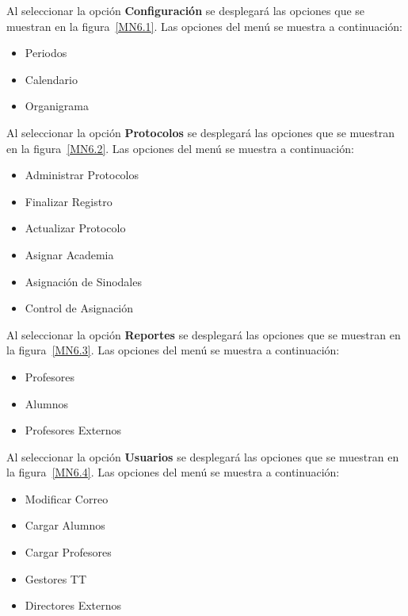 	
	
	Al seleccionar la opción \textbf{Configuración} se desplegará las opciones que se muestran en la figura~\ref{MN6.1}. Las opciones del menú se muestra a continuación:
	\begin{itemize}
		\item Periodos
		\item Calendario
		\item Organigrama
	\end{itemize}
	
	
	
	Al seleccionar la opción \textbf{Protocolos} se desplegará las opciones que se muestran en la figura~\ref{MN6.2}. Las opciones del menú se muestra a continuación:
	\begin{itemize}
		\item Administrar Protocolos
		\item Finalizar Registro
		\item Actualizar Protocolo
		\item Asignar Academia
		\item Asignación de Sinodales
		\item Control de Asignación
	\end{itemize}

	
	
	Al seleccionar la opción \textbf{Reportes} se desplegará las opciones que se muestran en la figura~\ref{MN6.3}. Las opciones del menú se muestra a continuación:
	\begin{itemize}
		\item Profesores
		\item Alumnos
		\item Profesores Externos
	\end{itemize}
	
	
	
	Al seleccionar la opción \textbf{Usuarios} se desplegará las opciones que se muestran en la figura~\ref{MN6.4}. Las opciones del menú se muestra a continuación:
	\begin{itemize}
		\item Modificar Correo
		\item Cargar Alumnos
		\item Cargar Profesores
		\item Gestores TT
		\item Directores Externos
	\end{itemize}

	